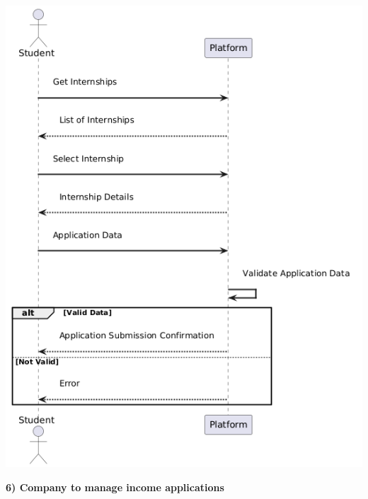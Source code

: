 \begin{center}
    \includegraphics[scale = 0.8]{Images/ImagesRASD/Student_application.png}
\end{center}

\newpage
\textbf{6) Company to manage income applications}\\

